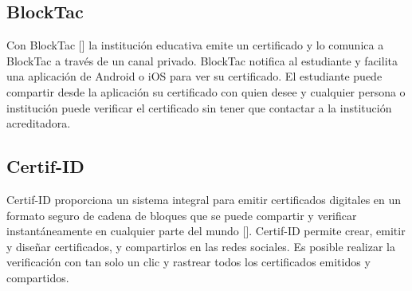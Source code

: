 


\subsection{BlockTac}
Con BlockTac [\cite{83}] la institución educativa emite un certificado y lo comunica a BlockTac a través de un canal privado. BlockTac notifica al estudiante y facilita una aplicación de Android o iOS para ver su certificado. El estudiante puede compartir desde la aplicación su certificado con quien desee y cualquier persona o institución puede verificar el certificado sin tener que contactar a la institución acreditadora.

%
\subsection{Certif-ID}
Certif-ID proporciona un sistema integral para emitir certificados digitales en un formato seguro de cadena de bloques que se puede compartir y verificar instantáneamente en cualquier parte del mundo [\cite{84}]. Certif-ID permite crear, emitir y diseñar certificados, y compartirlos en las redes sociales. Es posible realizar la verificación con tan solo un clic y  rastrear todos los certificados emitidos y compartidos.

